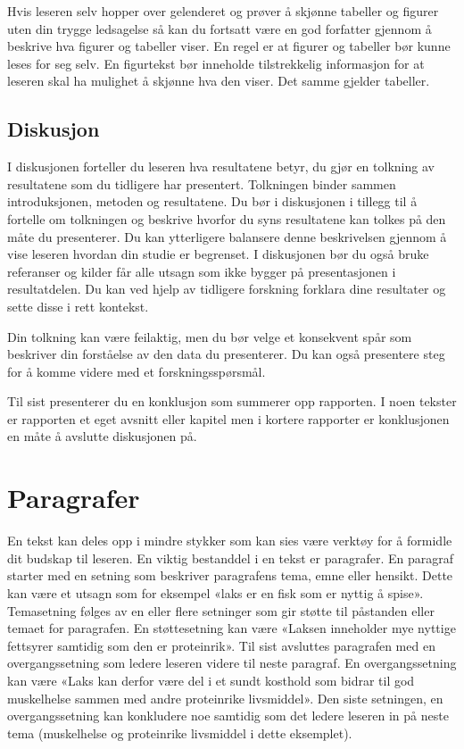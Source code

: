 \documentclass[
  letterpaper,
  DIV=11,
  numbers=noendperiod,
  oneside]{scrreprt}
\begin{document}
Hvis leseren selv hopper over gelenderet og prøver å skjønne tabeller og
figurer uten din trygge ledsagelse så kan du fortsatt være en god
forfatter gjennom å beskrive hva figurer og tabeller viser. En regel er
at figurer og tabeller bør kunne leses for seg selv. En figurtekst bør
inneholde tilstrekkelig informasjon for at leseren skal ha mulighet å
skjønne hva den viser. Det samme gjelder tabeller.

\hypertarget{diskusjon}{%
\subsection{Diskusjon}\label{diskusjon}}

I diskusjonen forteller du leseren hva resultatene betyr, du gjør en
tolkning av resultatene som du tidligere har presentert. Tolkningen
binder sammen introduksjonen, metoden og resultatene. Du bør i
diskusjonen i tillegg til å fortelle om tolkningen og beskrive hvorfor
du syns resultatene kan tolkes på den måte du presenterer. Du kan
ytterligere balansere denne beskrivelsen gjennom å vise leseren hvordan
din studie er begrenset. I diskusjonen bør du også bruke referanser og
kilder får alle utsagn som ikke bygger på presentasjonen i
resultatdelen. Du kan ved hjelp av tidligere forskning forklara dine
resultater og sette disse i rett kontekst.

Din tolkning kan være feilaktig, men du bør velge et konsekvent spår som
beskriver din forståelse av den data du presenterer. Du kan også
presentere steg for å komme videre med et forskningsspørsmål.

Til sist presenterer du en konklusjon som summerer opp rapporten. I noen
tekster er rapporten et eget avsnitt eller kapitel men i kortere
rapporter er konklusjonen en måte å avslutte diskusjonen på.

\hypertarget{paragrafer}{%
\section{Paragrafer}\label{paragrafer}}

En tekst kan deles opp i mindre stykker som kan sies være verktøy for å
formidle dit budskap til leseren. En viktig bestanddel i en tekst er
paragrafer. En paragraf starter med en setning som beskriver paragrafens
tema, emne eller hensikt. Dette kan være et utsagn som for eksempel
«laks er en fisk som er nyttig å spise». Temasetning følges av en eller
flere setninger som gir støtte til påstanden eller temaet for
paragrafen. En støttesetning kan være «Laksen inneholder mye nyttige
fettsyrer samtidig som den er proteinrik». Til sist avsluttes paragrafen
med en overgangssetning som ledere leseren videre til neste paragraf. En
overgangssetning kan være «Laks kan derfor være del i et sundt kosthold
som bidrar til god muskelhelse sammen med andre proteinrike livsmiddel».
Den siste setningen, en overgangssetning kan konkludere noe samtidig som
det ledere leseren in på neste tema (muskelhelse og proteinrike
livsmiddel i dette eksemplet).
\end{document}
